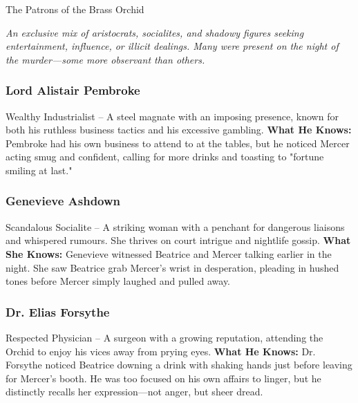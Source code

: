 
\begin{NPC}[description=The elite clientele of the Orchid]{The Patrons of the Brass Orchid}
	
    \emph{An exclusive mix of aristocrats, socialites, and shadowy figures seeking entertainment, influence, or illicit dealings. Many were present on the night of the murder—some more observant than others.}
        
	\subsubsection*{Lord Alistair Pembroke}
	Wealthy Industrialist – A steel magnate with an imposing presence, known for both his ruthless business tactics and his excessive gambling.  
	\textbf{What He Knows:} Pembroke had his own business to attend to at the tables, but he noticed Mercer acting smug and confident, calling for more drinks and toasting to "fortune smiling at last." 

	\subsubsection*{Genevieve Ashdown}
	Scandalous Socialite – A striking woman with a penchant for dangerous liaisons and whispered rumours. She thrives on court intrigue and nightlife gossip.
	\textbf{What She Knows:} Genevieve witnessed Beatrice and Mercer talking earlier in the night. She saw Beatrice grab Mercer’s wrist in desperation, pleading in hushed tones before Mercer simply laughed and pulled away.

	\subsubsection*{Dr. Elias Forsythe}
	Respected Physician – A surgeon with a growing reputation, attending the Orchid to enjoy his vices away from prying eyes.
	\textbf{What He Knows:} Dr. Forsythe noticed Beatrice downing a drink with shaking hands just before leaving for Mercer’s booth. He was too focused on his own affairs to linger, but he distinctly recalls her expression—not anger, but sheer dread.
\end{NPC}

